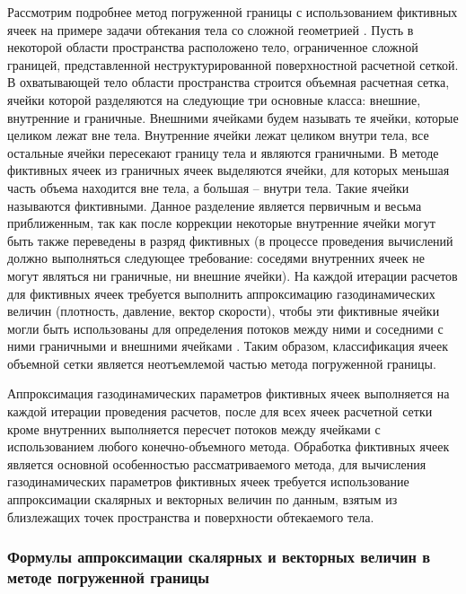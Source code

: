 Рассмотрим подробнее метод погруженной границы с использованием фиктивных ячеек \cite{Peter2016Immersed} на примере задачи обтекания тела со сложной геометрией \cite{Rybakov2020GeoIBM}.
Пусть в некоторой области пространства расположено тело, ограниченное сложной границей, представленной неструктурированной поверхностной расчетной сеткой.
В охватывающей тело области пространства строится объемная расчетная сетка, ячейки которой разделяются на следующие три основные класса: внешние, внутренние и граничные.
Внешними ячейками будем называть те ячейки, которые целиком лежат вне тела.
Внутренние ячейки лежат целиком внутри тела, все остальные ячейки пересекают границу тела и являются граничными.
В методе фиктивных ячеек из граничных ячеек выделяются ячейки, для которых меньшая часть объема находится вне тела, а большая -- внутри тела.
Такие ячейки называются фиктивными.
Данное разделение является первичным и весьма приближенным, так как после коррекции некоторые внутренние ячейки могут быть также переведены в разряд фиктивных (в процессе проведения вычислений должно выполняться следующее требование: соседями внутренних ячеек не могут являться ни граничные, ни внешние ячейки).
На каждой итерации расчетов для фиктивных ячеек требуется выполнить аппроксимацию газодинамических величин (плотность, давление, вектор скорости), чтобы эти фиктивные ячейки могли быть использованы для определения потоков между ними и соседними с ними граничными и внешними ячейками \cite{Vinnikov2007Immersed}.
Таким образом, классификация ячеек объемной сетки является неотъемлемой частью метода погруженной границы.

Аппроксимация газодинамических параметров фиктивных ячеек выполняется на каждой итерации проведения расчетов, после для всех ячеек расчетной сетки кроме внутренних выполняется пересчет потоков между ячейками с использованием любого конечно-объемного метода. Обработка фиктивных ячеек является основной особенностью рассматриваемого метода, для вычисления газодинамических параметров фиктивных ячеек требуется использование аппроксимации скалярных и векторных величин по данным, взятым из близлежащих точек пространства и поверхности обтекаемого тела.

\subsubsection{Формулы аппроксимации скалярных и векторных величин в методе погруженной границы}

